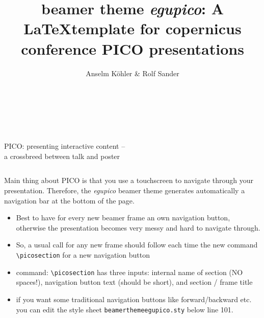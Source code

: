 \documentclass[usepdftitle=false,unknownkeysallowed,8pt]{beamer}
\title{beamer theme \textit{egupico}: A \LaTeX template for copernicus conference PICO presentations}
\author{Anselm K\"ohler \& Rolf Sander}
\institute{Git Repository: \url{https://github.com/snowtechblog/pico-latex-presentation}}
\begin{document}

\begin{frame}

  \begin{center}
    \centering {} \inserttitle\\\medskip
    \centering {} \insertauthor\\\medskip
    \centering {} \insertinstitute
  \end{center}
  \vspace{3cm}
  \begin{columns}%
    \begin{column}{0.66\textwidth}
      \large PICO: presenting interactive content -- \\ a crossbreed between talk and poster
    \end{column}
    \begin{column}{0.3\textwidth}
    \end{column}
  \end{columns}

\end{frame}


 \begin{frame}

   Main thing about PICO is that you use a touchscreen to navigate through your presentation. Therefore, the \textit{egupico} beamer theme generates automatically a navigation bar at the bottom of the page.

   \begin{itemize}%
   \item Best to have for every new beamer frame an own navigation button, otherwise the presentation becomes very messy and hard to navigate through.
   \item So, a usual call for any new frame should follow each time the new command \texttt{\textbackslash picosection} for a new navigation button
   \item command: \texttt{\textbackslash picosection} has three inputs: internal name of section (NO spaces!), navigation button text (should be short), and section / frame title\\
  \item if you want some traditional navigation buttons like forward/backward etc. you can edit the style sheet \texttt{beamerthemeegupico.sty} below line 101.

   \end{itemize}



 \end{frame}
\end{document}
